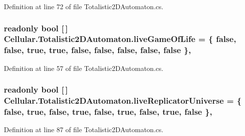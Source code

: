 Definition at line 72 of file Totalistic2\+D\+Automaton.\+cs.

\hypertarget{class_cellular_1_1_totalistic2_d_automaton_a4633d221a98d2f36cc876f5a08c61f1e}{}
\subsubsection[{live\+Game\+Of\+Life}]{\setlength{\rightskip}{0pt plus 5cm}readonly bool \mbox{[}$\,$\mbox{]} Cellular.\+Totalistic2\+D\+Automaton.\+live\+Game\+Of\+Life = \{ false, false, true, true, false, false, false, false, false \}\hspace{0.3cm}{\ttfamily [static]}, {\ttfamily [protected]}}\label{class_cellular_1_1_totalistic2_d_automaton_a4633d221a98d2f36cc876f5a08c61f1e}


Definition at line 57 of file Totalistic2\+D\+Automaton.\+cs.

\hypertarget{class_cellular_1_1_totalistic2_d_automaton_abb59a96261e32abc500ce4c7db88cdd6}{}
\subsubsection[{live\+Replicator\+Universe}]{\setlength{\rightskip}{0pt plus 5cm}readonly bool \mbox{[}$\,$\mbox{]} Cellular.\+Totalistic2\+D\+Automaton.\+live\+Replicator\+Universe = \{ false, true, false, true, false, true, false, true, false \}\hspace{0.3cm}{\ttfamily [static]}, {\ttfamily [protected]}}\label{class_cellular_1_1_totalistic2_d_automaton_abb59a96261e32abc500ce4c7db88cdd6}


Definition at line 87 of file Totalistic2\+D\+Automaton.\+cs.

\hypertarget{class_cellular_1_1_totalistic2_d_automaton_a4752e3402c58243f7f342e21ddad3b05}{}
